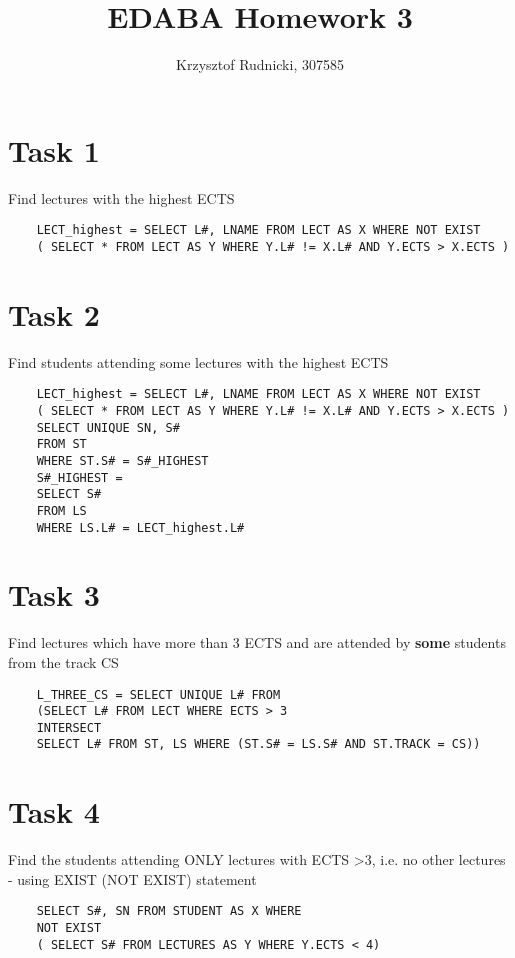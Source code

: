 \documentclass[12pt]{article}
\title{EDABA Homework 3}
\author{Krzysztof Rudnicki, 307585}
\begin{document}
\maketitle
\section{Task 1}
Find lectures with the highest ECTS 



\begin{verbatim}
    LECT_highest = SELECT L#, LNAME FROM LECT AS X WHERE NOT EXIST 
    ( SELECT * FROM LECT AS Y WHERE Y.L# != X.L# AND Y.ECTS > X.ECTS )
    \end{verbatim}
\section{Task 2}
Find students attending some lectures with the highest ECTS 
\begin{verbatim}
    LECT_highest = SELECT L#, LNAME FROM LECT AS X WHERE NOT EXIST 
    ( SELECT * FROM LECT AS Y WHERE Y.L# != X.L# AND Y.ECTS > X.ECTS )
    SELECT UNIQUE SN, S#
    FROM ST
    WHERE ST.S# = S#_HIGHEST
    S#_HIGHEST = 
    SELECT S# 
    FROM LS
    WHERE LS.L# = LECT_highest.L#
    \end{verbatim}
    \newpage
\section{Task 3}
Find lectures which have more than 3 ECTS and are attended by \textbf{some} students from the track CS
\begin{verbatim}
    L_THREE_CS = SELECT UNIQUE L# FROM
    (SELECT L# FROM LECT WHERE ECTS > 3 
    INTERSECT 
    SELECT L# FROM ST, LS WHERE (ST.S# = LS.S# AND ST.TRACK = CS)) 
    \end{verbatim}
\section{Task 4}
Find the students attending  ONLY lectures with ECTS >3, i.e. no other lectures - using EXIST (NOT EXIST) statement
\begin{verbatim}
    SELECT S#, SN FROM STUDENT AS X WHERE
    NOT EXIST 
    ( SELECT S# FROM LECTURES AS Y WHERE Y.ECTS < 4)     
    \end{verbatim}
\end{document}
